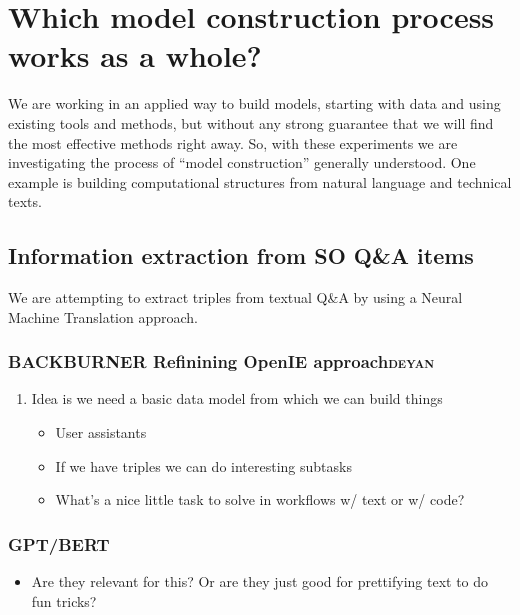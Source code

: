 \documentclass[11pt]{article}
\begin{document}
\section{Which model construction process works as a whole?}
\label{sec:org9653f37}
We are working in an applied way to build models, starting with data
and using existing tools and methods, but without any strong guarantee
that we will find the most effective methods right away. So, with
these experiments we are investigating the process of “model
construction” generally understood. One example is building
computational structures from natural language and technical texts.

\subsection{Information extraction from SO Q\&A items}
\label{sec:orgc3a37e5}
We are attempting to extract triples from textual Q\&A by using a
Neural Machine Translation approach.

\subsubsection{{\bfseries\sffamily BACKBURNER} Refinining OpenIE approach\hfill{}\textsc{deyan}}
\label{sec:org717d638}

\begin{enumerate}
\item Idea is we need a basic data model from which we can build things
\label{sec:orgc2a52f9}

\begin{itemize}
\item User assistants
\item If we have triples we can do interesting subtasks
\item What’s a nice little task to solve in workflows w/ text or w/ code?
\end{itemize}
\end{enumerate}

\subsubsection{GPT/BERT}
\label{sec:org95da877}

\begin{itemize}
\item Are they relevant for this? Or are they just good for prettifying
text to do fun tricks?
\end{itemize}
\end{document}
